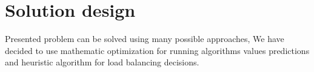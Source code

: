 \chapter{Solution design}\label{ch:solution-design}
Presented problem can be solved using many possible approaches,
We have decided to use mathematic optimization for running algorithms values predictions
and heuristic algorithm for load balancing decisions.



\newpage


